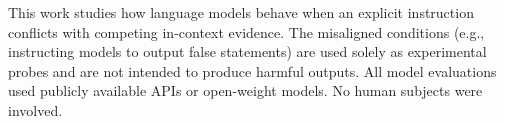 \documentclass{article} %
\begin{document}
This work studies how language models behave when an explicit instruction conflicts with competing in-context evidence.
The misaligned conditions (e.g., instructing models to output false
statements) are used solely as experimental probes and are not
intended to produce harmful outputs. All model evaluations used
publicly available APIs or open-weight models. No human subjects
were involved.






\appendix

\end{document}
